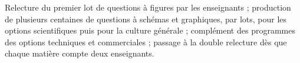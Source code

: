 \documentclass[11pt,a4paper]{article}
\begin{document}
\vspace{8pt}
\begin{encadre}[title=Prochaines étapes]
Relecture du premier lot de questions à figures par les enseignants ; production de plusieurs centaines de questions à schémas et graphiques, par lots, pour les options scientifiques puis pour la culture générale ; complément des programmes des options techniques et commerciales ; passage à la double relecture dès que chaque matière compte deux enseignants.
\end{encadre}
\end{document}
